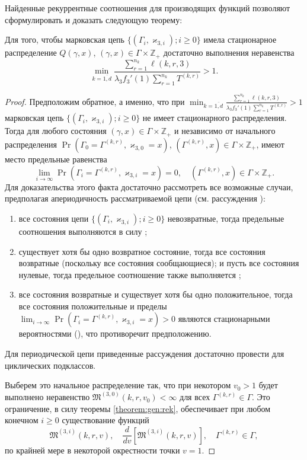 \documentclass[a4paper,12pt,russian]{extarticle}
\newcommand{\MarkThree}{\{(\Gamma_i, \varkappa_{3,i}); i \geqslant 0\}}
\begin{document}
Найденные рекуррентные соотношения для производящих функций позволяют сформулировать и доказать следующую теорему:
\begin{theorem}
Для того, чтобы марковская цепь $\MarkThree$ имела стационарное распределение $Q(\gamma,x)$, $(\gamma,x)\in \Gamma \times {\mathbb Z}_+$ достаточно выполнения неравенства 
$$
\min_{k=\overline{1,d}} { \frac{\sum_{r = 1}^{n_k} \ell(k,r,3) }{\lambda_3 f_3'(1) \sum_{r=1}^{n_k} T^{(k,r)} }}>1.
$$
\end{theorem}
\begin{proof}
Предположим обратное, а именно, что при $\min_{k=\overline{1,d}} { \frac{\sum_{r = 1}^{n_k} \ell(k,r,3) }{\lambda_3 f_3'(1) \sum_{r=1}^{n_k} T^{(k,r)} }}
>1$ марковская цепь $\MarkThree$ не имеет стационарного распределения. 
Тогда для любого состояния $(\gamma,x)\in \Gamma \times {\mathbb Z}_+$ и независимо от начального распределения $\Pr(\Gamma_{0}=\Gamma^{(k,r)}, \varkappa_{3,0}=x)$,
$(\Gamma^{(k,r)},x)\in \Gamma \times {\mathbb Z}_+$, 
имеют место предельные равенства 
\begin{equation}
\lim_{i \to \infty} \Pr(\Gamma_{i}=\Gamma^{(k,r)}, \varkappa_{3,i}=x) =0, \quad  (\Gamma^{(k,r)},x)\in \Gamma \times {\mathbb Z}_+.
\label{zero:limit:equations}
\end{equation} 
Для доказательства этого факта достаточно рассмотреть все возможные случаи, предполагая апериодичность рассматриваемой цепи (см. рассуждения \cite[гл. $3$, пар.~3-4]{Shiryaev}):
\begin{enumerate}
\item все состояния цепи $\MarkThree$ невозвратные, тогда предельные соотношения выполняются в силу \cite[с. 541, лемма $2$]{Shiryaev};
\item существует хотя бы одно возвратное состояние, тогда все состояния возвратные (поскольку все состояния сообщающиеся); и пусть все состояния нулевые, тогда предельное соотношение также выполняется \cite[с. 541, лемма $3$]{Shiryaev};
\item все состояния возвратные и существует хотя бы одно положительное, тогда все состояния положительные и пределы $\lim_{i \to \infty} \Pr(\Gamma_{i}=\Gamma^{(k,r)}, \varkappa_{3,i}=x) > 0$ являются стационарными вероятностями (\cite[с. 549, теорема $1$]{Shiryaev}), что противоречит предположению.
\end{enumerate}
Для периодической цепи приведенные рассуждения достаточно провести для циклических подклассов.

Выберем это начальное распределение так, что при некотором $v_0 >1$  будет выполнено неравенство $\mathfrak{M}^{(3,0)}(k,r,v_0) <\infty$ для всех $\Gamma^{(k,r)}\in \Gamma$. Это ограничение, в силу теоремы \eqref{theorem:gen:rek}, обеспечивает при любом конечном $i\geqslant 0$ существование функций 
\begin{equation}
\mathfrak{M}^{(3,i)}(k,r,v),\quad \frac{d}{dv} \left[\mathfrak{M}^{(3,i)}(k,r,v)\right], \quad \Gamma^{(k,r)} \in \Gamma,
\end{equation}
по крайней мере в некоторой окрестности точки $v=1$.


\end{proof}
\end{document}
